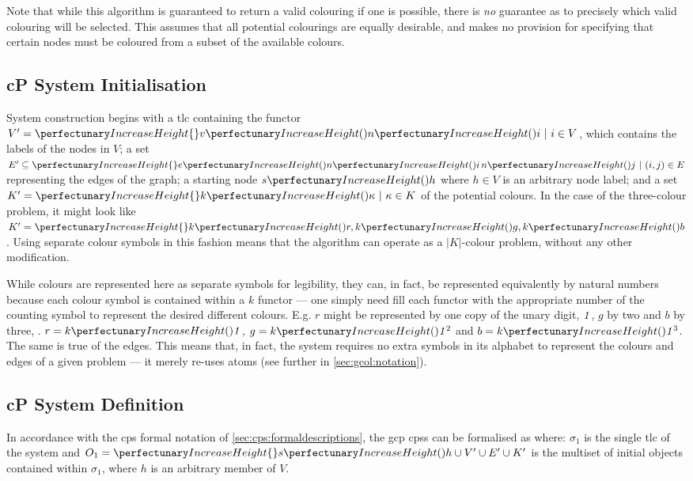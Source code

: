 Note that while this algorithm is guaranteed to return a valid colouring if one is possible, there is \emph{no} guarantee as to precisely which valid colouring will be selected.  This  assumes that all potential colourings are equally desirable, and makes no provision for specifying that certain nodes must be coloured from a subset of the available colours.

\subsection{\label{sec:gcol:sysinit}cP System Initialisation}
System construction begins with a \gls{tlc} containing the functor \(V' = \cpset{\cpfunc{v}{\cpfunc{n}{i}} ~|~i \in V}\), which contains the labels of the nodes in \(V\); a set \(E' \subseteq \cpset{\cpfunc{e}{\cpfunc{n}{i} \, \cpfunc{n}{j}} ~|~(i,j) \in E}\) representing the edges of the graph; a starting node \(\cpfunc{s}{h}\) where \(h \in V\) is an arbitrary node label; and a set \(K' = \cpset{\cpfunc{k}{\kappa} ~|~ \kappa \in K}\) of  the potential colours.  In the case of the three-colour problem, it might look like \(K' = \cpset{\cpfunc{k}{r}, \cpfunc{k}{g}, \cpfunc{k}{b}}\). Using separate colour symbols in this fashion means that the algorithm can operate as a \(|K|\)-colour problem, without any other modification.

While colours are represented here as separate symbols for legibility, they can, in fact, be represented equivalently by natural numbers because each colour symbol is contained within a \(k\) functor --- one simply need fill each functor with the appropriate number of the counting symbol to represent the desired different colours.  E.g. \(r\) might be represented by one copy of the unary digit, \(\mathit{1}\), \(g\) by two and \(b\) by three, \ie{}. \(r = \cpfunc{k}{\cpundig}\), \(g = \cpfunc{k}{\cpundig^2}\) and \(b = \cpfunc{k}{\cpundig^3}\).  The same is true of the edges.  This means that, in fact, the system requires no extra symbols in its alphabet to represent the colours and edges of a given problem --- it merely re-uses atoms (see further in \cref{sec:gcol:notation}).

\subsection{\label{sec:gcol:notation}cP System Definition}

In accordance with the \gls{cps} formal notation of \cref{sec:cps:formaldescriptions}, the \gls{gcp} \glspl{cps} can be formalised as  where: \(\sigma_1\) is the single \gls{tlc} of the system and \(O_1 = \cpset{\cpfunc{s}{h}} \cup V' \allowbreak \cup E' \allowbreak \cup K'\) is the multiset of initial objects contained within \(\sigma_1\), where \(h\) is an arbitrary member of \(V\).


